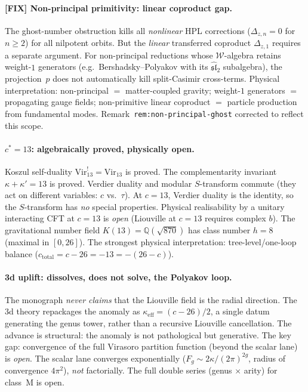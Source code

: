 \documentclass[11pt]{article}
\newcommand{\Q}{\mathbb{Q}}
\begin{document}
\paragraph{{\bfseries [FIX]} Non-principal primitivity: linear
coproduct gap.}  The ghost-number obstruction kills all
\emph{nonlinear} HPL corrections ($\Delta_{z,n} = 0$ for $n \ge 2$)
for all nilpotent orbits.  But the \emph{linear} transferred
coproduct $\Delta_{z,1}$ requires a separate argument.  For
non-principal reductions whose $\mathcal{W}$-algebra retains
weight-$1$ generators (e.g.\ Bershadsky--Polyakov with its
$\widehat{\mathfrak{sl}}_2$ subalgebra), the projection~$p$ does not
automatically kill split-Casimir cross-terms.  Physical
interpretation: non-principal $=$ matter-coupled gravity; weight-$1$
generators $=$ propagating gauge fields; non-primitive linear
coproduct $=$ particle production from fundamental modes.
Remark~\texttt{rem:non-principal-ghost} corrected to reflect this
scope.

\paragraph{$c^* = 13$: algebraically proved, physically open.}
Koszul self-duality $\mathrm{Vir}_{13}^! = \mathrm{Vir}_{13}$ is
proved.  The complementarity invariant $\kappa + \kappa' = 13$ is
proved.  Verdier duality and modular $S$-transform commute (they
act on different variables: $c$ vs.\ $\tau$).  At $c = 13$, Verdier
duality is the identity, so the $S$-transform has \emph{no}
special properties.  Physical realisability by a unitary interacting
CFT at $c = 13$ is \emph{open} (Liouville at $c = 13$ requires
complex $b$).  The gravitational number field $K(13) =
\Q(\sqrt{870})$ has class number $h = 8$ (maximal in $[0,26]$).
The strongest physical interpretation: tree-level/one-loop balance
($c_{\mathrm{total}} = c - 26 = -13 = -(26-c)$).

\paragraph{3d uplift: dissolves, does not solve, the Polyakov loop.}
The monograph \emph{never claims} that the Liouville field is the
radial direction.  The 3d theory repackages the anomaly as
$\kappa_{\mathrm{eff}} = (c-26)/2$, a single datum generating the
genus tower, rather than a recursive Liouville cancellation.  The
advance is structural: the anomaly is not pathological but
generative.  The key gap: convergence of the full Virasoro partition
function (beyond the scalar lane) is \emph{open}.  The scalar lane
converges exponentially ($F_g \sim 2\kappa/(2\pi)^{2g}$, radius of
convergence $4\pi^2$), \emph{not} factorially.  The full double
series (genus $\times$ arity) for class~M is open.
\end{document}
